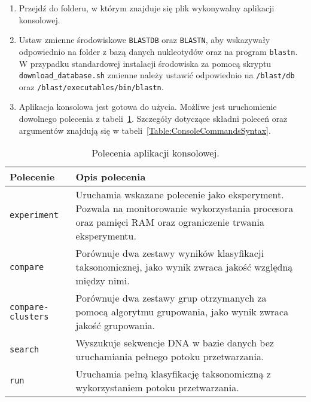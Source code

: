                 \begin{enumerate}
                    \item {
                        Przejdź do folderu, w którym znajduje się plik wykonywalny aplikacji konsolowej.
                    }
                    \item {
                        Ustaw zmienne środowiskowe \texttt{BLASTDB} oraz \texttt{BLASTN}, aby wskazywały odpowiednio na folder z bazą danych nukleotydów oraz na program \texttt{blastn}. 
                        W przypadku standardowej instalacji środowiska za pomocą skryptu \texttt{download\_database.sh} zmienne należy ustawić odpowiednio na \texttt{/blast/db} oraz \texttt{/blast/executables/bin/blastn}.
                    }
                    \item {
                        Aplikacja konsolowa jest gotowa do użycia. Możliwe jest uruchomienie dowolnego polecenia z tabeli~\ref{Table:ConsoleCommands}. Szczegóły dotyczące składni poleceń oraz argumentów znajdują się w tabeli~\ref{Table:ConsoleCommandsSyntax}.
                    }
                \end{enumerate}

                \begin{table}[!ht] \centering
                    \caption{Polecenia aplikacji konsolowej.}\label{Table:ConsoleCommands}

                    \begin{tabularx}{\textwidth}{| >{\footnotesize}m{} |  >{\footnotesize}X |} 
                        \hline
                        \textbf{\normalsize Polecenie}  & \textbf{\normalsize Opis polecenia} \\ \hline \hline
                        \texttt{experiment} 	        & Uruchamia wskazane polecenie jako eksperyment. Pozwala na monitorowanie wykorzystania procesora oraz pamięci RAM oraz ograniczenie trwania eksperymentu. \\ \hline
                        \texttt{compare}		        & Porównuje dwa zestawy wyników klasyfikacji taksonomicznej, jako wynik zwraca jakość względną między nimi. \\ \hline
                        \texttt{compare-clusters} 	    & Porównuje dwa zestawy grup otrzymanych za pomocą algorytmu grupowania, jako wynik zwraca jakość grupowania. \\ \hline
                        \texttt{search}                 & Wyszukuje sekwencje DNA w bazie danych bez uruchamiania pełnego potoku przetwarzania. \\ \hline
                        \texttt{run}		            & Uruchamia pełną klasyfikację taksonomiczną z wykorzystaniem potoku przetwarzania. \\ \hline
                    \end{tabularx}
                
                \end{table}

